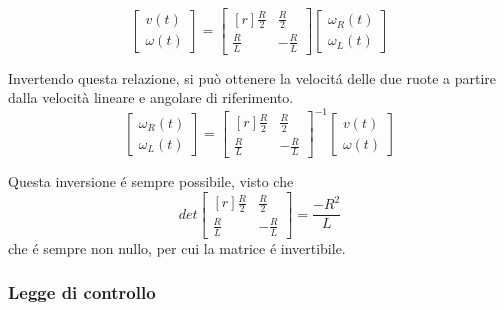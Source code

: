 \documentclass[14pt,a4paper]{extarticle}
\begin{document}
\begin{equation}
\begin{bmatrix}
v(t) \\
\omega(t)
\end{bmatrix}
=
\begin{bmatrix*}[r]
\frac{R}{2} & \frac{R}{2} \\
\frac{R}{L} & -\frac{R}{L}
\end{bmatrix*}
\begin{bmatrix}
\omega_R(t) \\
\omega_L(t)
\end{bmatrix}
\end{equation} 

Invertendo questa relazione, si può ottenere la velocitá delle due ruote a partire dalla velocità lineare e angolare di riferimento.
\begin{equation}
\label{wrwl}
\begin{bmatrix}
\omega_R(t) \\
\omega_L(t)
\end{bmatrix}
=
\begin{bmatrix*}[r]
\frac{R}{2} & \frac{R}{2} \\
\frac{R}{L} & -\frac{R}{L}
\end{bmatrix*}^{-1}
\begin{bmatrix}
v(t) \\
\omega(t)
\end{bmatrix}
\end{equation}

Questa inversione é sempre possibile, visto che
\[det\begin{bmatrix*}[r]
\frac{R}{2} & \frac{R}{2} \\
\frac{R}{L} & -\frac{R}{L}
\end{bmatrix*} = \frac{-R^2}{L}\] che é sempre non nullo, per cui la matrice é invertibile.


\subsubsection{Legge di controllo \cite{dalfonso}}
\end{document}
